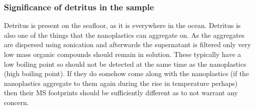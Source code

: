 \documentclass[twocolumn,a4paper,aps,amsmath,amssymb,floatfix,superscriptaddress]{revtex4-2}
\begin{document}
	\subsubsection{Significance of detritus in the sample}
	Detritus is present on the seafloor, as it is everywhere in the ocean. Detritus is also one of the things that the nanoplastics can aggregate on. As the aggregates are dispersed using sonication and afterwards the supernatant is filtered only very low mass organic compounds should remain in solution. These typically have a low boiling point so should not be detected at the same time as the nanoplastics (high boiling point). \cite{McMurry} If they do somehow come along with the nanoplastics (if the nanoplastics aggregate to them again during the rise in temperature perhaps) then their MS footprints should be sufficiently different as to not warrant any concern.
\end{document}
